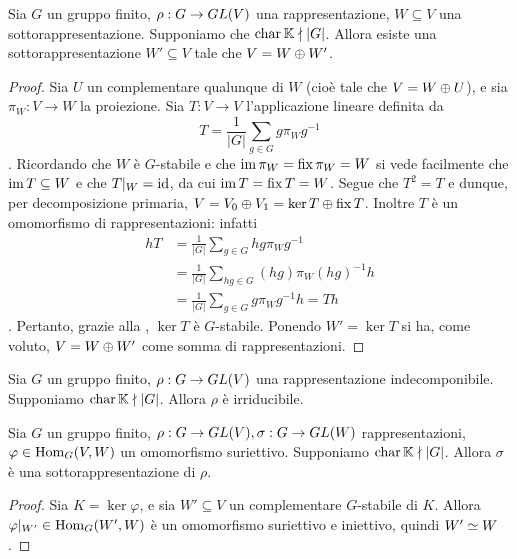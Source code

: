 \begin{proposition}
Sia $G$ un gruppo finito, $\rho:G\to GL(V)$ una rappresentazione, $W\subseteq V$ una sottorappresentazione. Supponiamo che $\operatorname{char}\mathbb{K}\nmid|G|$. Allora esiste una sottorappresentazione $W'\subseteq V$ tale che $V=W\oplus W'$.
\end{proposition}
\begin{proof}
Sia $U$ un complementare qualunque di $W$ (cioè tale che $V=W\oplus U$), e sia $\pi_W:V\to W$ la proiezione. Sia $T:V\to V$ l'applicazione lineare definita da
$$
T=\frac{1}{|G|}\sum_{g\in G}g\pi_Wg^{-1}
$$
. Ricordando che $W$ è $G$-stabile e che $\operatorname{im}\pi_W=\operatorname{fix}\pi_W=W$ si vede facilmente che $\operatorname{im} T\subseteq W$ e che $T|_W=\operatorname{id}$, da cui $\operatorname{im} T=\operatorname{fix} T=W$. Segue che $T^2=T$ e dunque, per decomposizione primaria, $V=V_0\oplus V_1=\ker T\oplus\operatorname{fix} T$. Inoltre $T$ è un omomorfismo di rappresentazioni: infatti
\begin{align*}
hT&=\frac{1}{|G|}\sum_{g\in G}hg\pi_Wg^{-1}\\
&=\frac{1}{|G|}\sum_{hg\in G}(hg)\pi_W(hg)^{-1}h\\
&=\frac{1}{|G|}\sum_{g\in G}g\pi_Wg^{-1}h=Th
\end{align*}
. Pertanto, grazie alla , $\ker T$ è $G$-stabile. Ponendo $W'=\ker T$ si ha, come voluto, $V=W\oplus W'$  come somma di rappresentazioni.
\end{proof}

\begin{corollary}
Sia $G$ un gruppo finito, $\rho:G\to GL(V)$ una rappresentazione indecomponibile. Supponiamo $\operatorname{char}\mathbb{K}\nmid |G|$. Allora $\rho$ è irriducibile.
\end{corollary}

\begin{corollary}
Sia $G$ un gruppo finito, $\rho:G\to GL(V),\allowbreak\sigma:G\to GL(W)$ rappresentazioni, $\varphi\in\operatorname{Hom}_G(V,W)$ un omomorfismo suriettivo. Supponiamo $\operatorname{char}\mathbb{K}\nmid|G|$. Allora $\sigma$ è una sottorappresentazione di $\rho$.
\end{corollary}
\begin{proof}
Sia $K=\ker\varphi$, e sia $W'\subseteq V$ un complementare $G$-stabile di $K$. Allora $\varphi|_{W'}\in\operatorname{Hom}_G(W',W)$ è un omomorfismo suriettivo e iniettivo, quindi $W'\simeq W$.
\end{proof}


